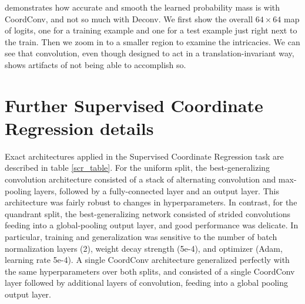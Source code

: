 \documentclass{article}
\begin{document}
 demonstrates how accurate and smooth the learned probability mass is with CoordConv, and not so much with Deconv. We first show the overall $64\times64$ map of logits, one for a training example and one for a test example just right next to the train. Then we zoom in to a smaller region to examine the intricacies. We can see that convolution, even though designed to act in a translation-invariant way, shows artifacts of not being able to accomplish so.



\section{Further Supervised Coordinate Regression details}

Exact architectures applied in the Supervised Coordinate Regression task are described in table \ref{scr_table}.
For the uniform split, the best-generalizing convolution architecture consisted of a stack of alternating
convolution and max-pooling layers, followed by a fully-connected layer and an output layer. This architecture
was fairly robust to changes in hyperparameters. In contrast, for the quandrant split, the best-generalizing
network consisted of strided convolutions feeding into a global-pooling output layer, and good performance
was delicate. In particular, training and generalization was sensitive to the number of batch normalization layers (2), weight decay strength (5e-4), and optimizer (Adam, learning rate 5e-4). A single CoordConv architecture generalized perfectly with the same hyperparameters over both splits, and consisted of a single CoordConv layer followed by additional layers of convolution, feeding into a global pooling output layer.
\end{document}
